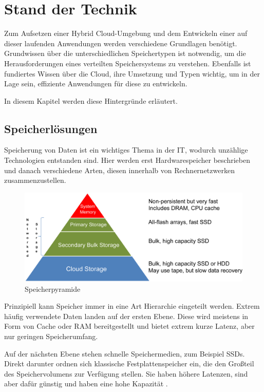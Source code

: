 \chapter{Stand der Technik}\label{ch:background}

Zum Aufsetzen einer Hybrid Cloud-Umgebung und dem Entwickeln einer auf dieser laufenden Anwendungen werden verschiedene Grundlagen benötigt. Grundwissen über die unterschiedlichen Speichertypen ist notwendig, um die Herausforderungen eines verteilten Speichersystems zu verstehen. Ebenfalls ist fundiertes Wissen über die Cloud, ihre Umsetzung und Typen wichtig, um in der Lage sein, effiziente Anwendungen für diese zu entwickeln.

In diesem Kapitel werden diese Hintergründe erläutert.

\section{Speicherlösungen} \label{sec:storage}
Speicherung von Daten ist ein wichtiges Thema in der IT, wodurch unzählige Technologien entstanden sind. Hier werden erst Hardwarespeicher beschrieben und danach verschiedene Arten, diesen innerhalb von Rechnernetzwerken zusammenzustellen.

\begin{figure}[hbt]
	\centering
	\includegraphics[scale=0.75]{images/storage-pyramide}
	\caption{Speicherpyramide \parencite{kaufmann.2016}}
	\label{fig:storagepyramide}
\end{figure}

Prinzipiell kann Speicher immer in eine Art Hierarchie eingeteilt werden. Extrem häufig verwendete Daten landen auf der ersten Ebene. Diese wird meistens in Form von Cache oder RAM bereitgestellt und bietet extrem kurze Latenz, aber nur geringen Speicherumfang.

Auf der nächsten Ebene stehen schnelle Speichermedien, zum Beispiel SSDs. Direkt darunter ordnen sich klassische Festplattenspeicher ein, die den Großteil des Speichervolumens zur Verfügung stellen. Sie haben höhere Latenzen, sind aber dafür günstig und haben eine hohe Kapazität \parencite[Kap. 2, What is Computer Storage?]{kaufmann.2016}.

